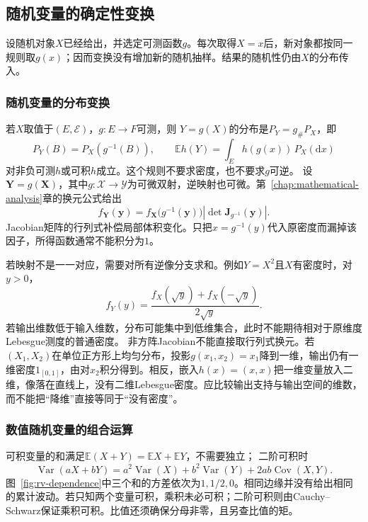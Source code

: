 \subsection{随机变量的确定性变换}
设随机对象\(X\)已经给出，并选定可测函数\(g\)。每次取得\(X=x\)后，新对象都按同一规则取\(g(x)\)；因而变换没有增加新的随机抽样。结果的随机性仍由\(X\)的分布传入。

\subsubsection{随机变量的分布变换}
\label{sec:rv-pushforward}
若\(X\)取值于\((E,\mathcal E)\)，\(g:E\to F\)可测，则
\(Y=g(X)\)的分布是\(P_Y=g_\#P_X\)，即
\[
P_Y(B)=P_X(g^{-1}(B)),\qquad
\mathbb E h(Y)=\int_E h(g(x))\,P_X(\mathrm dx)
\]
对非负可测\(h\)或可积\(h\)成立。这个规则不要求密度，也不要求\(g\)可逆。
设\(\bm{Y}=g(\bm{X})\)，其中\(g:\mathcal{X}\to\mathcal{Y}\)为可微双射，逆映射也可微。第~\ref{chap:mathematical-analysis}章的换元公式给出
\begin{equation}
  f_{\bm{Y}}(\bm{y})
  =
  f_{\bm{X}}\bigl(g^{-1}(\bm{y})\bigr)
  \left|
    \det\bm{J}_{g^{-1}}(\bm{y})
  \right|.
  \label{eq:probability-density-change-variables}
\end{equation}
Jacobian矩阵的行列式补偿局部体积变化。只把\(x=g^{-1}(y)\)代入原密度而漏掉该因子，所得函数通常不能积分为\(1\)。

若映射不是一一对应，需要对所有逆像分支求和。例如\(Y=X^2\)且\(X\)有密度时，对\(y>0\)，
\[ f_Y(y)
  =\frac{f_X(\sqrt{y})+f_X(-\sqrt{y})}{2\sqrt{y}}. \]
若输出维数低于输入维数，分布可能集中到低维集合，此时不能期待相对于原维度Lebesgue测度的普通密度。
非方阵Jacobian不能直接取行列式换元。若
\((X_1,X_2)\)在单位正方形上均匀分布，投影\(g(x_1,x_2)=x_1\)降到一维，输出仍有一维密度\(1_{[0,1]}\)，由对\(x_2\)积分得到。相反，嵌入\(h(x)=(x,x)\)把一维变量放入二维，像落在直线上，没有二维Lebesgue密度。应比较输出支持与输出空间的维数，而不能把“降维”直接等同于“没有密度”。

\subsubsection{数值随机变量的组合运算}
\label{sec:rv-combinations}
可积变量的和满足\(\mathbb E(X+Y)=\mathbb EX+\mathbb EY\)，不需要独立；
二阶可积时
\[
\operatorname{Var}(aX+bY)
=a^2\operatorname{Var}(X)+b^2\operatorname{Var}(Y)
 +2ab\operatorname{Cov}(X,Y).
\]
图~\ref{fig:rv-dependence}中三个和的方差依次为\(1,1/2,0\)。相同边缘并没有给出相同的累计波动。若只知两个变量可积，乘积未必可积；二阶可积则由Cauchy--Schwarz保证乘积可积。比值还须确保分母非零，且另查比值的矩。

